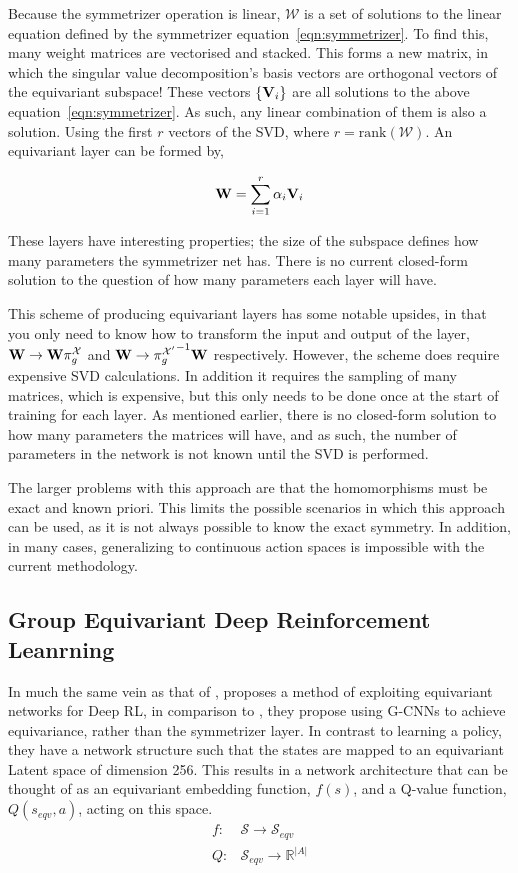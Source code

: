 Because the symmetrizer operation is linear, $\mathcal{W}$ is a set of solutions to the linear equation defined by the symmetrizer equation~\ref{eqn:symmetrizer}. To find this, many weight matrices are vectorised and stacked. This forms a new matrix, in which the singular value decomposition's basis vectors are orthogonal vectors of the equivariant subspace! These vectors $\{\mathbf{V}_i\}$ are all solutions to the above equation~\ref{eqn:symmetrizer}. As such, any linear combination of them is also a solution. Using the first $r$ vectors of the SVD, where $r= \text{rank}(\mathcal{W})$. An equivariant layer can be formed by,

\begin{equation}
	\mathbf{W} = \sum_{i=1}^{r}{\alpha_i\mathbf{V}_i}
\end{equation}

These layers have interesting properties; the size of the subspace defines how many parameters the symmetrizer net has. There is no current closed-form solution to the question of how many parameters each layer will have.

This scheme of producing equivariant layers has some notable upsides, in that you only need to know how to transform the input and output of the layer, $\mathbf{W} \rightarrow \mathbf{W}\pi_g^\mathcal{X}$ and $\mathbf{W} \rightarrow {\pi_g^{\mathcal{X}'}}^{-1} \mathbf{W}$ respectively. However, the scheme does require expensive SVD calculations. In addition it requires the sampling of many matrices, which is expensive, but this only needs to be done once at the start of training for each layer. As mentioned earlier, there is no closed-form solution to how many parameters the matrices will have, and as such, the number of parameters in the network is not known until the SVD is performed.

The larger problems with this approach are that the homomorphisms must be exact and known priori. This limits the possible scenarios in which this approach can be used, as it is not always possible to know the exact symmetry. In addition, in many cases, generalizing to continuous action spaces is impossible with the current methodology.


\subsection{Group Equivariant Deep Reinforcement Leanrning}
In much the same vein as that of \cite{vanderpol2020mdp}, \cite{mondal2020group} proposes a method of exploiting equivariant networks for Deep RL, in comparison to \cite{vanderpol2020mdp}, they propose using G-CNNs \cite{cohen2016group} to achieve equivariance, rather than the symmetrizer layer. In contrast to learning a policy, they have a network structure such that the states are mapped to an equivariant Latent space of dimension 256. This results in a network architecture that can be thought of as an equivariant embedding function, $f(s)$, and a Q-value function, $Q(s_{eqv}, a)$, acting on this space.
\begin{align}
	f: & \mathcal{S} \rightarrow \mathcal{S}_{eqv}      \\
	Q: & \mathcal{S}_{eqv} \rightarrow \mathbb{R}^{|A|}
\end{align}

